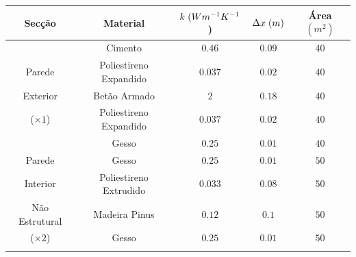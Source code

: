 \documentclass[12pt, a4paper]{article}
\begin{document}
\begin{table}[htpb]
	\begin{center}
		\begin{tabular}{c c c c c}
			\toprule{}
			Secção                     & Material               & $ k \hspace{1mm} (Wm^{-1}K^{-1}$) & $ \Delta x \hspace{1mm} (m)$ & Área $(m^2) $ \\
				\midrule{}

			\multirow{5}{*}{}          & Cimento                & $0.46$                            & $0.09$                       & $40$          \\
				\cline{2-5}
			Parede                     & Poliestireno Expandido & $0.037$                           & $0.02$                       & $40$          \\
				\cline{2-5}
			Exterior                   & Betão Armado           & $2$                               & $0.18$                       & $40$          \\
				\cline{2-5}
			($\times 1$)               & Poliestireno Expandido & $0.037$                           & $0.02$                       & $40$          \\
				\cline{2-5}
			                           & Gesso                  & $0.25$                            & $0.01$                       & $40$          \\
				\midrule{}

			Parede \multirow{4}{*}{}   & Gesso                  & $0.25$                            & $0.01$                       & $50$          \\
				\cline{2-5}
			Interior                   & Poliestireno Extrudido & $0.033$                           & $0.08$                       & $50$          \\
				\cline{2-5}
			Não Estrutural             & Madeira Pinus          & $0.12$                            & $0.1$                        & $50$          \\
				\cline{2-5}
			($\times2$)                & Gesso                  & $0.25$                            & $0.01$                       & $50$          \\
				\midrule{}


\end{tabular}
\end{center}
\end{table}
\end{document}
